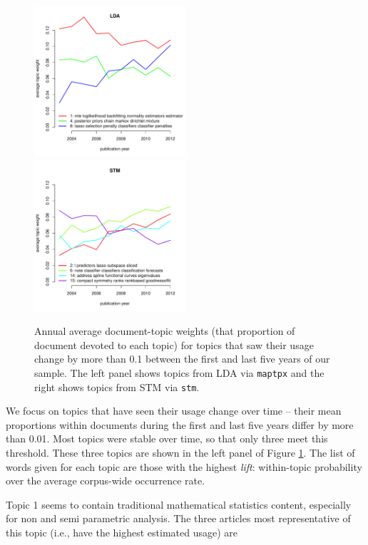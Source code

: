 \documentclass[12pt]{article}
\begin{document}
\begin{figure}
\includegraphics[width=0.5\textwidth]{lda}
\includegraphics[width=0.5\textwidth]{stm}
\caption{\label{fig:topics} Annual average document-topic weights (that proportion of document devoted to each topic) for topics that saw their usage change by more than 0.1 between the first and last five years of our sample.  The left panel shows  topics from LDA via {\tt maptpx} and the right shows topics from STM via {\tt stm}. }
\end{figure}

We focus on topics that have seen their usage change over time -- their
mean proportions within documents during the first and last five years
differ by more than 0.01.  Most topics were stable over time, so that
only three meet this threshold.   These three topics are shown in
the left panel of Figure \ref{fig:topics}.  The list of words given for each topic are those with the highest {\it lift}: within-topic probability over the average corpus-wide occurrence rate.  

Topic 1 seems to contain traditional mathematical statistics content, especially for non and semi parametric analysis.  The three articles most representative of this topic (i.e., have the highest estimated usage) are 
\end{document}
